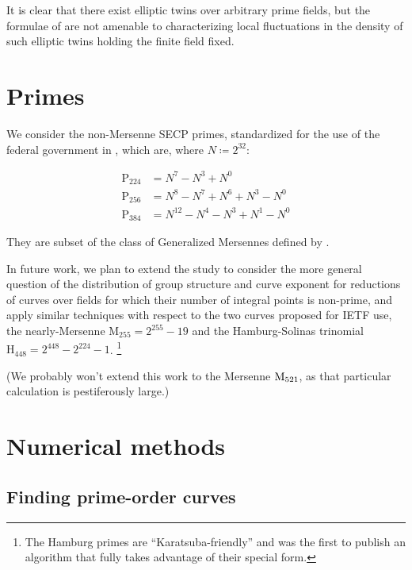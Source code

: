 \documentclass[11pt,fleqn]{article}
\newcommand{\Pa}{\ensuremath{\mathup{P}_{224}} }
\newcommand{\Pb}{\ensuremath{\mathup{P}_{256}} }
\newcommand{\Pc}{\ensuremath{\mathup{P}_{384}} }
\newcommand{\Pd}{\ensuremath{\mathup{M}_{255}} }
\newcommand{\Pg}{\ensuremath{\mathup{H}_{448}} }
\begin{document}
It is clear that there exist elliptic twins over arbitrary prime fields, but
the formulae of \autocite{ShparlinskiSutantyo} are not amenable to characterizing
local fluctuations in the density of such elliptic twins holding the finite
field fixed.

\section{Primes}

We consider the non-Mersenne SECP primes, standardized for the use of the
federal government in \cite{recur}, which are, where $N \coloneqq 2^{32}$:

\begin{equation}
\begin{aligned}
    \Pa &= N^7 - N^3 + N^0                \\
    \Pb &= N^8 - N^7 + N^6 + N^3 - N^0    \\
    \Pc &= N^{12} - N^4 - N^3 + N^1 - N^0
\end{aligned}
\end{equation}

They are subset of the class of Generalized Mersennes defined by
\autocite{Solinas}.


In future work, we plan to extend the study to consider the more general question
of the distribution of group structure and curve exponent for reductions of
curves over fields for which their number of integral points is non-prime, and apply
similar techniques with respect to the two curves proposed for IETF use, the
nearly-Mersenne $\Pd = 2^{255}-19$ and the Hamburg-Solinas trinomial $\Pg = 2^{448}-2^{224}-1$.
\footnote{The Hamburg primes are ``Karatsuba-friendly'' and \autocite{Hamburg}
was the first to publish an algorithm that fully takes advantage of their special
form.}

(We probably won't extend this work to the Mersenne $\textup{M}_{521}$, as that
particular calculation is pestiferously large.)

\section{Numerical methods}

\subsection{Finding prime-order curves}
\end{document}
